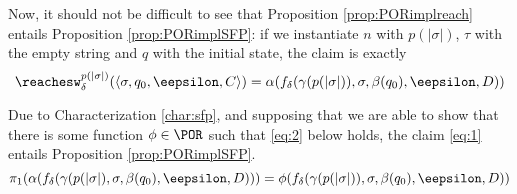 \begin{conditional}{\notappendix}

  Now, it should not be difficult to see that Proposition \ref{prop:PORimplreach}
  entails Proposition \ref{prop:PORimplSFP}:
  if we instantiate $n$ with $p(|\sigma|)$, $\tau$ with
  the empty string and $q$ with the initial state, the claim is exactly
%
  \begin{equation}
    \label{eq:1}
    \reachesw^{p(|\sigma|)}_\delta(\langle \sigma, q_0, \eepsilon, C\rangle) =
    \alpha(f_\delta(\gamma (p(|\sigma|)),\sigma, \beta(q_0), \eepsilon, D))
  \end{equation}

  Due to Characterization \ref{char:sfp}, and supposing that we are able to show that
  there is some function $\phi \in \POR$ such that \eqref{eq:2} below holds,
  the claim \eqref{eq:1} entails Proposition \ref{prop:PORimplSFP}.
%
  \begin{equation}
    \label{eq:2}
    \pi_1(\alpha(f_\delta(\gamma (p(|\sigma|),\sigma, \beta(q_0), \eepsilon, D)))= \phi(f_\delta(\gamma (p(|\sigma|)),\sigma, \beta(q_0), \eepsilon, D))
  \end{equation}


\end{conditional}
